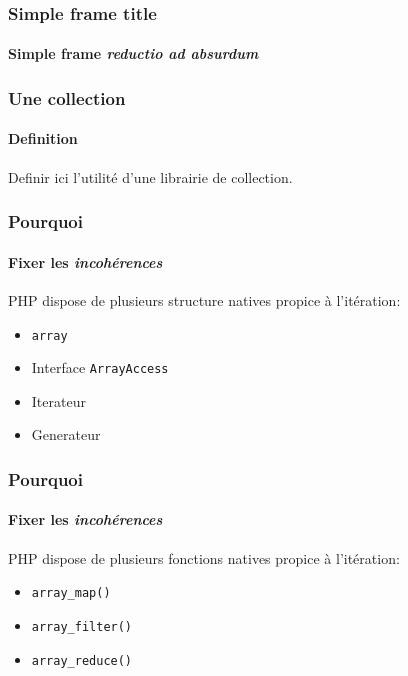 




\begin{frame}[plain]
	\titlepage{}
\end{frame}

\begin{frame}[allowframebreaks]
	\frametitle{Simple frame title}
	\framesubtitle{Simple frame \textit{reductio ad absurdum}}
\end{frame}

\begin{frame}
	\frametitle{Une collection}
    \framesubtitle{Definition}

    Definir ici l'utilité d'une librairie de collection.
\end{frame}

\begin{frame}
	\frametitle{Pourquoi}
    \framesubtitle{Fixer les \textit{incohérences}}

    PHP dispose de plusieurs structure natives propice à l'itération:

    \begin{itemize}[<+->]
        \item \texttt{array}
        \item Interface \texttt{ArrayAccess}
        \item Iterateur
        \item Generateur
    \end{itemize}
\end{frame}

\begin{frame}
	\frametitle{Pourquoi}
    \framesubtitle{Fixer les \textit{incohérences}}

    PHP dispose de plusieurs fonctions natives propice à l'itération:

    \begin{itemize}[<+->]
        \item \texttt{array\_map()}
        \item \texttt{array\_filter()}
        \item \texttt{array\_reduce()}
    \end{itemize}
\end{frame}


